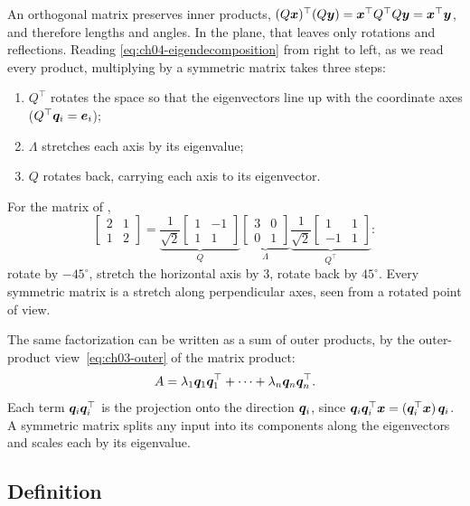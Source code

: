 An orthogonal matrix preserves inner products, $(Q\bm{x})^\top
(Q\bm{y}) = \bm{x}^\top Q^\top Q \bm{y} = \bm{x}^\top \bm{y}$, and
therefore lengths and angles. In the plane, that leaves only rotations
and reflections. Reading \cref{eq:ch04-eigendecomposition} from right to
left, as we read every product, multiplying by a symmetric matrix takes
three steps:
\begin{enumerate}
  \item $Q^\top$ rotates the space so that the eigenvectors line up with
    the coordinate axes ($Q^\top \bm{q}_i = \bm{e}_i$);
  \item $\Lambda$ stretches each axis by its eigenvalue;
  \item $Q$ rotates back, carrying each axis to its eigenvector.
\end{enumerate}
For the matrix of ,
\[
  \begin{bmatrix} 2 & 1 \\ 1 & 2 \end{bmatrix}
  =
  \underbrace{\frac{1}{\sqrt2}
    \begin{bmatrix} 1 & -1 \\ 1 & 1 \end{bmatrix}}_{Q}
  \underbrace{\begin{bmatrix} 3 & 0 \\ 0 & 1 \end{bmatrix}}_{\Lambda}
  \underbrace{\frac{1}{\sqrt2}
    \begin{bmatrix} 1 & 1 \\ -1 & 1 \end{bmatrix}}_{Q^\top} :
\]
rotate by $-45^\circ$, stretch the horizontal axis by $3$, rotate back by
$45^\circ$. Every symmetric matrix is a stretch along perpendicular axes,
seen from a rotated point of view.

The same factorization can be written as a sum of outer products, by the
outer-product view~\eqref{eq:ch03-outer} of the matrix product:
\[
  A = \lambda_1 \bm{q}_1 \bm{q}_1^\top + \dots
    + \lambda_n \bm{q}_n \bm{q}_n^\top .
\]
Each term $\bm{q}_i \bm{q}_i^\top$ is the projection onto the direction
$\bm{q}_i$, since $\bm{q}_i \bm{q}_i^\top \bm{x} = (\bm{q}_i^\top
\bm{x})\, \bm{q}_i$. A symmetric matrix splits any input into its
components along the eigenvectors and scales each by its eigenvalue.

\subsection{Definition}
\label{sec:ch04-svd-def}

